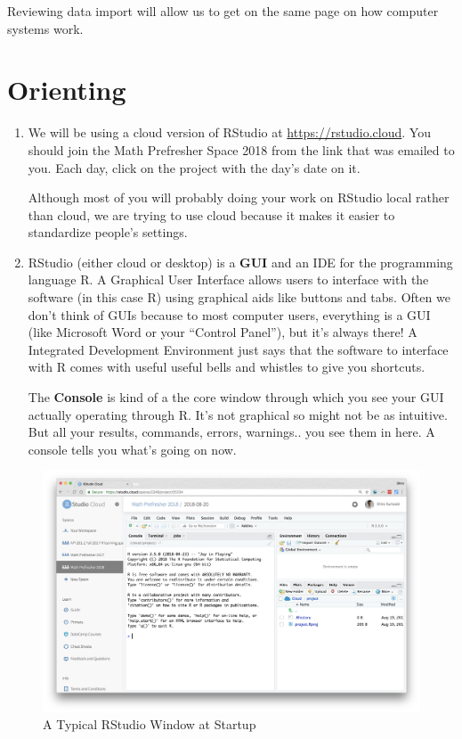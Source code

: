 \documentclass[]{book}
\theoremstyle{definition}
\theoremstyle{definition}
\theoremstyle{definition}
\theoremstyle{remark}
\begin{document}
Reviewing data import will allow us to get on the same page on how computer systems work.

\hypertarget{orienting}{%
\section{Orienting}\label{orienting}}

\begin{enumerate}
\def\labelenumi{\arabic{enumi}.}
\item
  We will be using a cloud version of RStudio at \url{https://rstudio.cloud}. You should join the Math Prefresher Space 2018 from the link that was emailed to you. Each day, click on the project with the day's date on it.

  Although most of you will probably doing your work on RStudio local rather than cloud, we are trying to use cloud because it makes it easier to standardize people's settings.
\item
  RStudio (either cloud or desktop) is a \textbf{GUI} and an IDE for the programming language R. A Graphical User Interface allows users to interface with the software (in this case R) using graphical aids like buttons and tabs. Often we don't think of GUIs because to most computer users, everything is a GUI (like Microsoft Word or your ``Control Panel''), but it's always there! A Integrated Development Environment just says that the software to interface with R comes with useful useful bells and whistles to give you shortcuts.

  The \textbf{Console} is kind of a the core window through which you see your GUI actually operating through R. It's not graphical so might not be as intuitive. But all your results, commands, errors, warnings.. you see them in here. A console tells you what's going on now.
\end{enumerate}

\begin{figure}
\centering
\includegraphics{images/11_1_rstudio-startup.png}
\caption{A Typical RStudio Window at Startup}
\end{figure}
\end{document}
